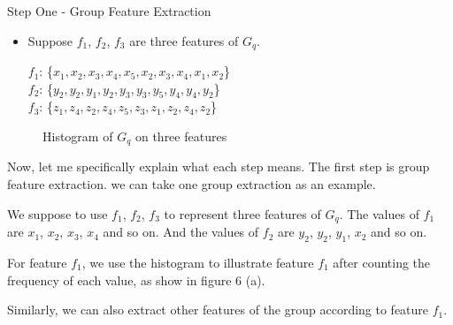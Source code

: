 \documentclass[
size=14pt,
paper=smartboard,  %
mode=present, 		%
display=slides, 	%
style=tuliplab,  	%
pauseslide,
fleqn,leqno]{powerdot}
\begin{document}
	
	\begin{slide}{Step One - Group Feature Extraction}
	\begin{itemize}
		\item
		\smallskip
		Suppose $f_1$, $f_2$, $f_3$ are three features of $G_q$.
		
		$f_1$: \{$x_1, x_2, x_3, x_4, x_5, x_2, x_3, x_4, x_1, x_2$\} \\
		
		$f_2$: \{$y_2, y_2, y_1, y_2, y_3, y_3, y_5, y_4, y_4, y_2$\} \\
		
		$f_3$: \{$z_1, z_4, z_2, z_4, z_5, z_3, z_1, z_2, z_4, z_2$\} \\
	\end{itemize}
	
	\begin{figure}[htbp]
		\centering
		\caption{Histogram of $G_q$ on three features}
		\label{fig:fre-dis-each-feature}
	\end{figure}
	
	\begin{note}
		Now, let me specifically explain what each step means.
		The first step is group feature extraction.
		we can take one group extraction as an example.
		
		We suppose to use $f_1$, $f_2$, $f_3$ to represent three features of $G_q$.
		The values of $f_1$ are {$x_1$, $x_2$, $x_3$, $x_4$} and so on.
		And the values of $f_2$ are {$y_2$, $y_2$, $y_1$, $x_2$} and so on.
		
		For feature $f_1$,
		we use the histogram to illustrate feature $f_1$ after
		counting the frequency of each value,
		as show in figure 6 (a).
		
		Similarly,
		we can also extract other features of the group
		according to feature $f_1$.
	\end{note}
	
\end{slide}
\end{document}
